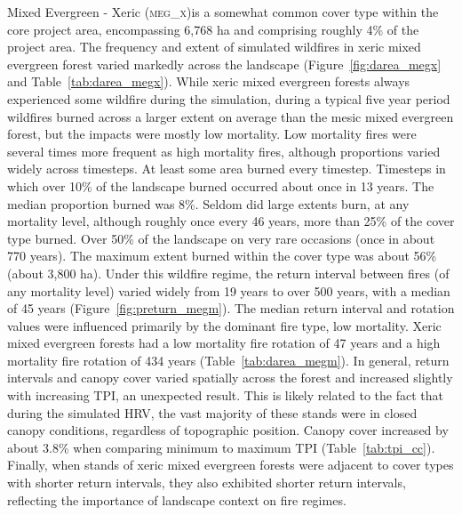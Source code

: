 Mixed Evergreen - Xeric (\textsc{meg\_x})is a somewhat common cover type within the core project area, encompassing 6,768 ha and comprising roughly 4\% of the project area. The frequency and extent of simulated wildfires in xeric mixed evergreen forest varied markedly across the landscape (Figure~\ref{fig:darea_megx} and Table~\ref{tab:darea_megx}). %
%
While xeric mixed evergreen forests always experienced some wildfire during the simulation, during a typical five year period wildfires burned across a larger extent on average than the mesic mixed evergreen forest, but the impacts were mostly low mortality. Low mortality fires were several times more frequent as high mortality fires, although proportions varied widely across timesteps. At least some area burned every timestep. Timesteps in which over 10\% of the landscape burned occurred about once in 13 years. The median proportion burned was 8\%. Seldom did large extents burn, at any mortality level, although roughly once every 46 years, more than 25\% of the cover type burned. Over 50\% of the landscape on very rare occasions (once in about 770 years). The maximum extent burned within the cover type was about 56\% (about 3,800 ha). %
%
Under this wildfire regime, the return interval between fires (of any mortality level) varied widely from 19 years to over 500 years, with a median of 45 years (Figure~\ref{fig:preturn_megm}). The median return interval and rotation values were influenced primarily by the dominant fire type, low mortality. Xeric mixed evergreen forests had a low mortality fire rotation of 47 years and a high mortality fire rotation of 434 years (Table~\ref{tab:darea_megm}).  %
%
In general, return intervals and canopy cover varied spatially across the forest and increased slightly with increasing TPI, an unexpected result. This is likely related to the fact that during the simulated HRV, the vast majority of these stands were in closed canopy conditions, regardless of topographic position. Canopy cover increased by about 3.8\% when comparing minimum to maximum TPI (Table~\ref{tab:tpi_cc}). %
%
Finally, when stands of xeric mixed evergreen forests were adjacent to cover types with shorter return intervals, they also exhibited shorter return intervals, reflecting the importance of landscape context on fire regimes.

